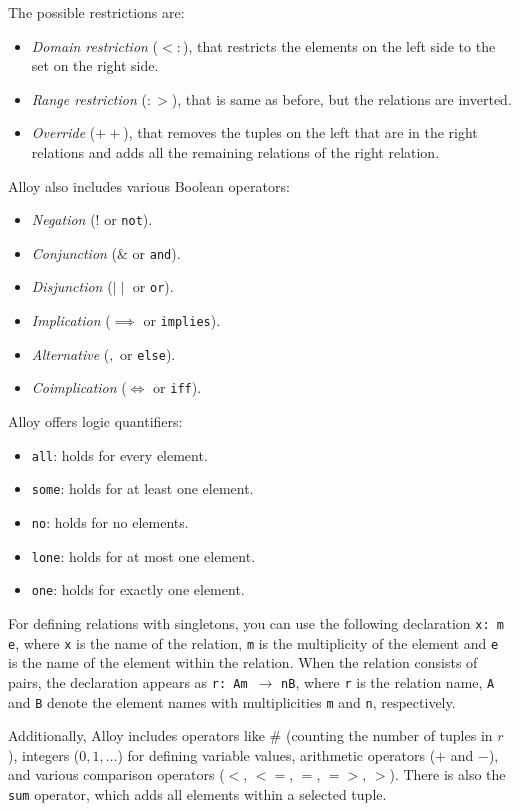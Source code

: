 The possible restrictions are: 
\begin{itemize}
    \item \textit{Domain restriction} ($<:$), that restricts the elements on the left side to the set on the right side.
    \item \textit{Range restriction} ($:>$), that is same as before, but the relations are inverted. 
    \item \textit{Override} ($++$), that removes the tuples on the left that are in the right relations and adds all the remaining relations of the right relation. 
\end{itemize}
Alloy also includes various Boolean operators:
\begin{itemize}
    \item \textit{Negation} ($!$ or \texttt{not}). 
    \item \textit{Conjunction} ($\&$ or \texttt{and}). 
    \item \textit{Disjunction} ($\mid \mid$ or \texttt{or}). 
    \item \textit{Implication} ($\implies$ or \texttt{implies}). 
    \item \textit{Alternative} ($,$ or \texttt{else}). 
    \item \textit{Coimplication} ($\iff$ or \texttt{iff}).
\end{itemize}
Alloy offers logic quantifiers:
\begin{itemize}
    \item \texttt{all}: holds for every element.
    \item \texttt{some}: holds for at least one element.
    \item \texttt{no}: holds for no elements.
    \item \texttt{lone}: holds for at most one element.
    \item \texttt{one}: holds for exactly one element.
\end{itemize}
For defining relations with singletons, you can use the following declaration \texttt{x: m e}, where \texttt{x} is the name of the relation, \texttt{m} is the multiplicity of the element and \texttt{e} is the name of the element within the relation. 
When the relation consists of pairs, the declaration appears as \texttt{r: Am }$\rightarrow$ \texttt{nB}, where \texttt{r} is the relation name, \texttt{A} and \texttt{B} denote the element names with multiplicities \texttt{m} and \texttt{n}, respectively.
    
Additionally, Alloy includes operators like $\#$ (counting the number of tuples in $r$), integers ($0,1,\dots$) for defining variable values, arithmetic operators ($+$ and $-$), and various comparison operators ($<$, $<=$, $=$, $=>$, $>$). 
There is also the \texttt{sum} operator, which adds all elements within a selected tuple.

